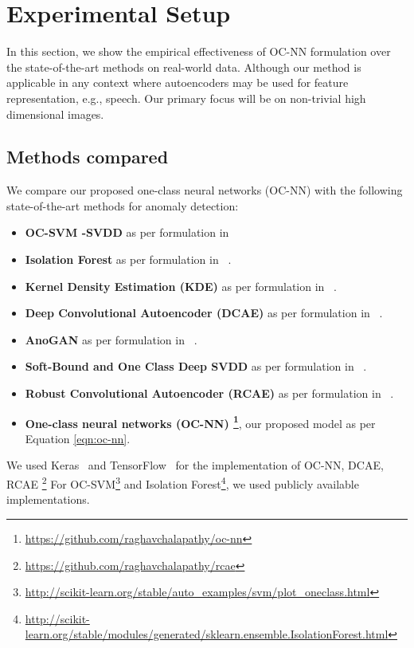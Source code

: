\section{Experimental Setup}
\label{sec:ocnn_experiment-setup}

In this section, we show the empirical effectiveness of OC-NN formulation over the state-of-the-art methods on real-world data. Although our method is applicable in any context where autoencoders may be used for feature representation, e.g., speech.  Our primary focus will be on non-trivial high dimensional images.
\subsection{Methods compared}
\label{sec:methods_compared}
We compare our proposed one-class neural networks (OC-NN) with the following state-of-the-art methods for anomaly detection:
\let\labelitemi\labelitemii
\begin{itemize}{}
	\item \textbf{OC-SVM -SVDD} as per formulation in ~\cite{scholkopf2002support}
    \item \textbf{Isolation Forest} as per formulation in ~\cite{liu2008isolation}.
	\item \textbf{Kernel Density Estimation (KDE)} as per formulation in ~\cite{parzen1962estimation}.
    \item \textbf{Deep Convolutional Autoencoder (DCAE)} as per formulation in ~\cite{masci2011stacked}.
    \item \textbf{AnoGAN} as per formulation in ~\cite{radford2015unsupervised}.
    \item \textbf{Soft-Bound and One Class Deep SVDD} as per formulation in ~\cite{pmlrv80ruff18a}.
    \item \textbf{Robust Convolutional Autoencoder (RCAE)} as per formulation in ~\cite{chalapathy2017robust}.
	\item \textbf{One-class neural networks (OC-NN) \footnote{\url{https://github.com/raghavchalapathy/oc-nn}}}, our proposed model as per Equation \ref{eqn:oc-nn}.
\end{itemize}
We used Keras~\cite{chollet2015keras} and  TensorFlow~\cite{abadi2016tensorflow} for the implementation of OC-NN, DCAE, RCAE \footnote{\url{https://github.com/raghavchalapathy/rcae}}
For OC-SVM\footnote{\url{http://scikit-learn.org/stable/auto_examples/svm/plot_oneclass.html}} and Isolation Forest\footnote{\url{http://scikit-learn.org/stable/modules/generated/sklearn.ensemble.IsolationForest.html}}, we used publicly available implementations.

